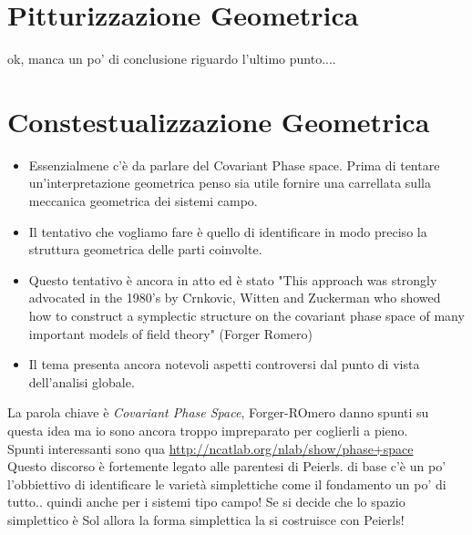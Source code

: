 \documentclass[Cascione]{subfiles}
\begin{document}
	\newpage
	\section{Pitturizzazione Geometrica}
		ok, manca un po' di conclusione riguardo l'ultimo punto....



	\newpage
	\section{Constestualizzazione Geometrica}
	\begin{itemize}
		\item 	Essenzialmene c'è da parlare del Covariant Phase space. Prima di tentare un'interpretazione geometrica penso sia utile fornire una carrellata sulla meccanica geometrica dei sistemi campo.
		\item 	Il tentativo che vogliamo fare è quello di identificare in modo preciso la struttura geometrica delle parti coinvolte.
		\item Questo tentativo è ancora in atto ed è stato "This approach was strongly advocated in the 1980’s by Crnkovic, Witten and Zuckerman who showed how to construct a symplectic structure on the covariant phase space of many important models of field theory" (Forger Romero)
		\item Il tema presenta ancora notevoli aspetti controversi dal punto di vista dell'analisi globale.
	\end{itemize}
	
	\begin{Warning}
		La parola chiave è \emph{Covariant Phase Space}, Forger-ROmero danno spunti su questa idea ma io sono ancora troppo impreparato per coglierli a pieno.\\
		Spunti interessanti sono qua \url{http://ncatlab.org/nlab/show/phase+space}
		\\
		Questo discorso è fortemente legato alle parentesi di Peierls. di base c'è un po' l'obbiettivo di identificare le varietà simplettiche come il fondamento un po' di tutto.. quindi anche per i sistemi tipo campo!
		Se si decide che lo spazio simplettico è Sol allora la forma simplettica la si costruisce con  Peierls!
	\end{Warning}	
	
\end{document}
